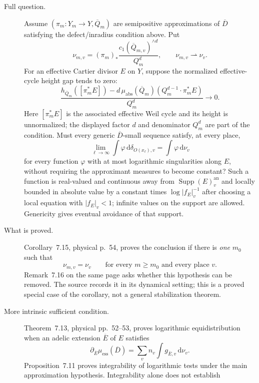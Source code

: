 \documentclass[11pt,a4paper]{article}
\theoremstyle{definition}
\theoremstyle{remark}
\newcommand{\rd}{\mathrm d}
\DeclareMathOperator{\Supp}{Supp}
\begin{document}
\begin{description}
\item[Full question.]
Assume $(\pi_m:Y_m\to Y,\overline Q_m)$ are semipositive approximations
of $\overline D$ satisfying the defect/inradius condition above. Put
\[
 \nu_{m,v}=(\pi_m)_*
   \frac{c_1(\overline Q_{m,v})^{\wedge d}}{Q_m^d},
 \qquad \nu_{m,v}\rightharpoonup\nu_v.
\]
For an effective Cartier divisor $E$ on $Y$, suppose the normalized
effective-cycle height gap tends to zero:
\begin{equation}\label{eq:supp-BS-cycle-gap}
 \frac{h_{\overline Q_m}([\pi_m^*E])
        -d\,\mu_{\mathrm{abs}}(\overline Q_m)
            (Q_m^{d-1}\cdot\pi_m^*E)}{Q_m^d}
     \longrightarrow0.
\end{equation}
Here $[\pi_m^*E]$ is the associated effective Weil cycle and its height
is unnormalized; the displayed factor $d$ and denominator $Q_m^d$
are part of the condition.
Must every generic $\overline D$-small sequence satisfy, at every place,
\[
 \lim_{\ell\to\infty}\int\varphi\,\rd\delta_{O(x_\ell),v}
       =\int\varphi\,\rd\nu_v
\]
for every function $\varphi$ with at most logarithmic singularities along
$E$, without requiring the approximant measures to become constant?
Such a function is real-valued and continuous away from
$\Supp(E)_v^{\mathrm{an}}$ and locally bounded in absolute value by a
constant times $\log|f_E|_v^{-1}$ after choosing a local equation with
$|f_E|_v<1$; infinite values on the support are allowed. Genericity gives
eventual avoidance of that support.
\item[What is proved.]
Corollary~7.15, physical p.~54, proves the conclusion if there is
\emph{one} $m_0$ such that
\[
 \nu_{m,v}=\nu_v\qquad\text{for every }m\geq m_0
                 \text{ and every place }v.
\]
Remark~7.16 on the same page asks whether this hypothesis can be removed.
The source records it in its dynamical setting; this is a proved special
case of the corollary, not a general stabilization theorem.
\item[More intrinsic sufficient condition.]
Theorem~7.13, physical pp.~52--53, proves logarithmic equidistribution
when an adelic extension $\overline E$ of $E$ satisfies
\begin{equation}\label{eq:supp-BS-green-equality}
 \partial_{\overline E}\mu_{\mathrm{ess}}(\overline D)
    =\sum_v n_v\int g_{\overline E,v}\,\rd\nu_v.
\end{equation}
Proposition~7.11 proves integrability of logarithmic tests under the main
approximation hypothesis. Integrability alone does not establish

\end{description}
\end{document}
